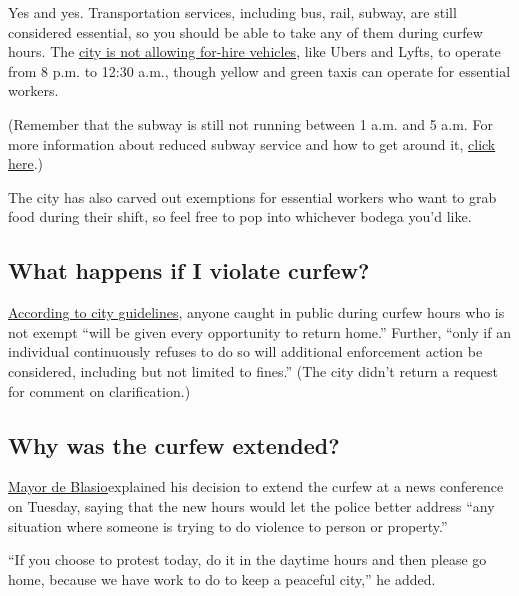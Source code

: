 Yes and yes. Transportation services, including bus, rail, subway, are
still considered essential, so you should be able to take any of them
during curfew hours. The
\href{https://www.nytimes3xbfgragh.onion/2020/06/02/nyregion/nyc-protests-george-floyd.html}{city
is not allowing for-hire vehicles}, like Ubers and Lyfts, to operate
from 8 p.m. to 12:30 a.m., though yellow and green taxis can operate for
essential workers.

(Remember that the subway is still not running between 1 a.m. and 5 a.m.
For more information about reduced subway service and how to get around
it, \href{https://new.mta.info/coronavirus}{click here}.)

The city has also carved out exemptions for essential workers who want
to grab food during their shift, so feel free to pop into whichever
bodega you'd like.

\hypertarget{what-happens-if-i-violate-curfew}{%
\subsection{What happens if I violate
curfew?}\label{what-happens-if-i-violate-curfew}}

\href{https://www1.nyc.gov/assets/counseltothemayor/downloads/Curfew-FAQ.pdf}{According
to city guidelines}, anyone caught in public during curfew hours who is
not exempt ``will be given every opportunity to return home.'' Further,
``only if an individual continuously refuses to do so will additional
enforcement action be considered, including but not limited to fines.''
(The city didn't return a request for comment on clarification.)

\hypertarget{why-was-the-curfew-extended}{%
\subsection{Why was the curfew
extended?}\label{why-was-the-curfew-extended}}

\href{https://www.nytimes3xbfgragh.onion/2020/06/02/nyregion/nyc-protests-george-floyd.html\#link-30ef7600}{Mayor
de Blasio}explained his decision to extend the curfew at a news
conference on Tuesday, saying that the new hours would let the police
better address ``any situation where someone is trying to do violence to
person or property.''

``If you choose to protest today, do it in the daytime hours and then
please go home, because we have work to do to keep a peaceful city,'' he
added.

